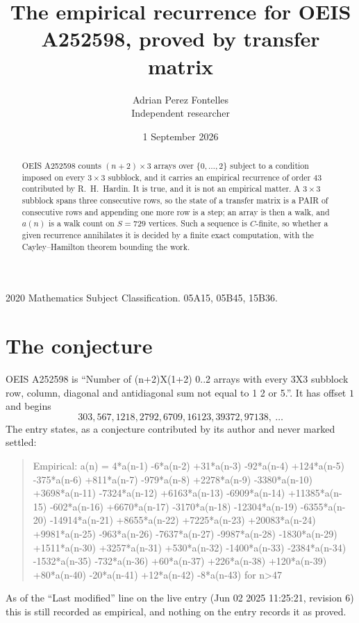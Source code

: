 \documentclass[11pt,a4paper]{article}
\title{The empirical recurrence for OEIS A252598, proved by transfer matrix}
\author{Adrian Perez Fontelles\\ \small Independent researcher}
\date{1 September 2026}
\theoremstyle{plain}
\theoremstyle{definition}
\begin{document}
\maketitle

\begin{abstract}
OEIS A252598 counts $(n+2)\times3$ arrays over $\{0,\dots,2\}$ subject to a condition imposed on
every $3\times3$ subblock, and it carries an empirical recurrence of order $43$
contributed by R.~H.~Hardin. It is true, and it is not an empirical matter. A $3\times3$
subblock spans three consecutive rows, so the state of a transfer matrix is a PAIR of
consecutive rows and appending one more row is a step; an array is then a walk, and
$a(n)$ is a walk count on $S=729$ vertices. Such a sequence is $C$-finite, so whether a given
recurrence annihilates it is decided by a finite exact computation, with the Cayley--Hamilton
theorem bounding the work.
\end{abstract}

\noindent\small 2020 Mathematics Subject Classification. 05A15, 05B45, 15B36.\normalsize

\section{The conjecture}

OEIS A252598 is ``Number of (n+2)X(1+2) 0..2 arrays with every 3X3 subblock row, column, diagonal and antidiagonal sum not equal to 1 2 or 5.''. It has offset $1$ and begins
\[
303, 567, 1218, 2792, 6709, 16123, 39372, 97138,\ \dots
\]
The entry states, as a conjecture contributed by its author and never marked settled:
\begin{quote}
Empirical: a(n) = 4*a(n-1) -6*a(n-2) +31*a(n-3) -92*a(n-4) +124*a(n-5) -375*a(n-6) +811*a(n-7) -979*a(n-8) +2278*a(n-9) -3380*a(n-10) +3698*a(n-11) -7324*a(n-12) +6163*a(n-13) -6909*a(n-14) +11385*a(n-15) -602*a(n-16) +6670*a(n-17) -3170*a(n-18) -12304*a(n-19) -6355*a(n-20) -14914*a(n-21) +8655*a(n-22) +7225*a(n-23) +20083*a(n-24) +9981*a(n-25) -963*a(n-26) -7637*a(n-27) -9987*a(n-28) -1830*a(n-29) +1511*a(n-30) +3257*a(n-31) +530*a(n-32) -1400*a(n-33) -2384*a(n-34) -1532*a(n-35) -732*a(n-36) +60*a(n-37) +226*a(n-38) +120*a(n-39) +80*a(n-40) -20*a(n-41) +12*a(n-42) -8*a(n-43) for n>47
\end{quote}
As of the ``Last modified'' line on the live entry (Jun 02 2025 11:25:21, revision 6) this is still
recorded as empirical, and nothing on the entry records it as proved.
\end{document}
